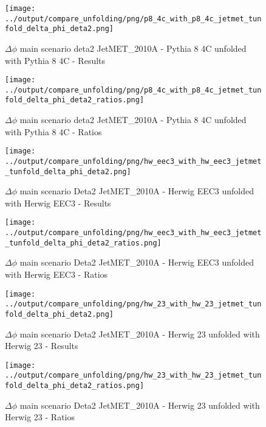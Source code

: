 \documentclass[11pt]{book}
\begin{document}
\begin{figure}[ht]
\centering
\texttt{[image: ../output/compare\_unfolding/png/p8\_4c\_with\_p8\_4c\_jetmet\_tunfold\_delta\_phi\_deta2.png]}
\caption{$\Delta\phi$ main scenario deta2 JetMET\_2010A - Pythia 8 4C unfolded with Pythia 8 4C - Results}
\label{p8_p8_jetmet_tunfold_delta_phi_deta2_a}
\end{figure}

\begin{figure}[ht]
\centering
\texttt{[image: ../output/compare\_unfolding/png/p8\_4c\_with\_p8\_4c\_jetmet\_tunfold\_delta\_phi\_deta2\_ratios.png]}
\caption{$\Delta\phi$ main scenario deta2 JetMET\_2010A - Pythia 8 4C unfolded with Pythia 8 4C - Ratios}
\label{p8_p8_jetmet_tunfold_delta_phi_deta2_b}
\end{figure}

\begin{figure}[ht]
\centering
\texttt{[image: ../output/compare\_unfolding/png/hw\_eec3\_with\_hw\_eec3\_jetmet\_tunfold\_delta\_phi\_deta2.png]}
\caption{$\Delta\phi$ main scenario Deta2 JetMET\_2010A - Herwig EEC3 unfolded with Herwig EEC3 - Results}
\label{hw_eec3_hw_eec3_jetmet_tunfold_delta_phi_deta2_a}
\end{figure}

\begin{figure}[ht]
\centering
\texttt{[image: ../output/compare\_unfolding/png/hw\_eec3\_with\_hw\_eec3\_jetmet\_tunfold\_delta\_phi\_deta2\_ratios.png]}
\caption{$\Delta\phi$ main scenario Deta2 JetMET\_2010A - Herwig EEC3 unfolded with Herwig EEC3 - Ratios}
\label{hw_eec3_hw_eec3_jetmet_tunfold_delta_phi_deta2_b}
\end{figure}

\begin{figure}[ht]
\centering
\texttt{[image: ../output/compare\_unfolding/png/hw\_23\_with\_hw\_23\_jetmet\_tunfold\_delta\_phi\_deta2.png]}
\caption{$\Delta\phi$ main scenario Deta2 JetMET\_2010A - Herwig 23 unfolded with Herwig 23 - Results}
\label{hw_23_hw_23_jetmet_tunfold_delta_phi_deta2_a}
\end{figure}

\begin{figure}[ht]
\centering
\texttt{[image: ../output/compare\_unfolding/png/hw\_23\_with\_hw\_23\_jetmet\_tunfold\_delta\_phi\_deta2\_ratios.png]}
\caption{$\Delta\phi$ main scenario Deta2 JetMET\_2010A - Herwig 23 unfolded with Herwig 23 - Ratios}
\label{hw_23_hw_23_jetmet_tunfold_delta_phi_deta2_b}
\end{figure}
\end{document}
